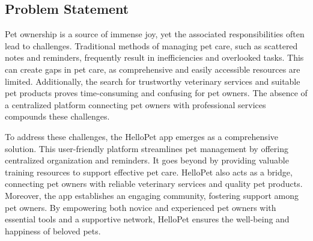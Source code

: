 \subsection{Problem Statement}
Pet ownership is a source of immense joy, yet the associated responsibilities often lead to challenges. Traditional methods of managing pet care, such as scattered notes and reminders, frequently result in inefficiencies and overlooked tasks. This can create gaps in pet care, as comprehensive and easily accessible resources are limited. Additionally, the search for trustworthy veterinary services and suitable pet products proves time-consuming and confusing for pet owners. The absence of a centralized platform connecting pet owners with professional services compounds these challenges.

\noindent To address these challenges, the HelloPet app emerges as a comprehensive solution. This user-friendly platform streamlines pet management by offering centralized organization and reminders. It goes beyond by providing valuable training resources to support effective pet care. HelloPet also acts as a bridge, connecting pet owners with reliable veterinary services and quality pet products. Moreover, the app establishes an engaging community, fostering support among pet owners. By empowering both novice and experienced pet owners with essential tools and a supportive network, HelloPet ensures the well-being and happiness of beloved pets.
